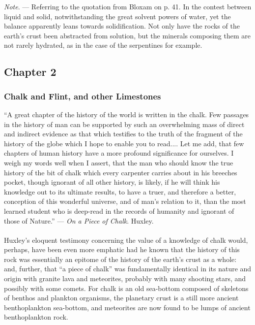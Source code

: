 \documentclass[a4paper, 12pt, oneside]{article}
\begin{document}
\emph{Note}. --- Referring to the quotation from Bloxam on p. 41. In the contest between liquid and solid, notwithstanding the great solvent powers of water, yet the balance apparently leans towards solidification. Not only have the rocks of the earth's crust been abstracted from solution, but the minerals composing them are not rarely hydrated, as in the case of the serpentines for example.
\clearpage
\subsection{Chapter 2}
\subsubsection{Chalk and Flint, and other Limestones}
\begin{displayquote}
``A great chapter of the history of the world is written in the chalk. Few passages in the history of man can be supported by such an overwhelming mass of direct and indirect evidence as that which testifies to the truth of the fragment of the history of the globe which I hope to enable you to read.... Let me add, that few chapters of human history have a more profound significance for ourselves. I weigh my words well when I assert, that the man who should know the true history of the bit of chalk which every carpenter carries about in his breeches pocket, though ignorant of all other history, is likely, if he will think his knowledge out to its ultimate results, to have a truer, and therefore a better, conception of this wonderful universe, and of man's relation to it, than the most learned student who is deep-read in the records of humanity and ignorant of those of Nature.'' --- \emph{On a Piece of Chalk}. Huxley.
\end{displayquote}
\paragraph{}
Huxley's eloquent testimony concerning the value of a knowledge of chalk would, perhaps, have been even more emphatic had he known that the history of this rock was essentially an epitome of the history of the earth's crust as a whole: and, further, that ``a piece of chalk'' was fundamentally identical in its nature and origin with granite lava and meteorites, probably with many shooting stars, and possibly with some comets. For chalk is an old sea-bottom composed of skeletons of benthos and plankton organisms, the planetary crust is a still more ancient benthoplankton sea-bottom, and meteorites are now found to be lumps of ancient benthoplankton rock.
\end{document}
